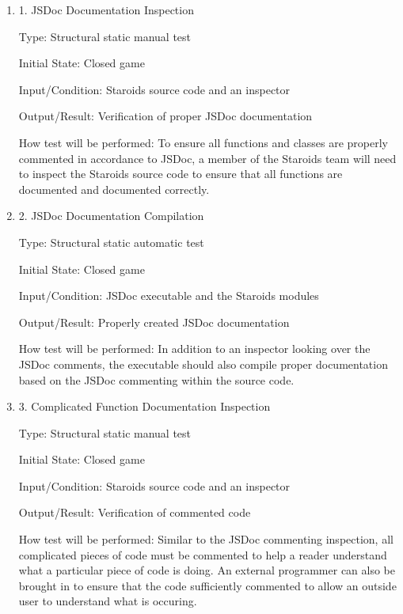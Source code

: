 \documentclass[12pt, titlepage]{article}
\begin{document}
\begin{enumerate}
  
\item{1. JSDoc Documentation Inspection\\}

Type: Structural static manual test

Initial State: Closed game

Input/Condition: Staroids source code and an inspector

Output/Result: Verification of proper JSDoc documentation

How test will be performed: To ensure all functions and classes are properly commented in accordance to JSDoc, a member of the Staroids team will need to inspect the Staroids source code to ensure that all functions are documented and documented correctly.

\item{2. JSDoc Documentation Compilation\\}

Type: Structural static automatic test

Initial State: Closed game

Input/Condition: JSDoc executable and the Staroids modules

Output/Result: Properly created JSDoc documentation

How test will be performed: In addition to an inspector looking over the JSDoc comments, the executable should also compile proper documentation based on the JSDoc commenting within the source code.

\item{3. Complicated Function Documentation Inspection\\}

Type: Structural static manual test

Initial State: Closed game

Input/Condition: Staroids source code and an inspector

Output/Result: Verification of commented code

How test will be performed: Similar to the JSDoc commenting inspection, all complicated pieces of code must be commented to help a reader understand what a particular piece of code is doing. An external programmer can also be brought in to ensure that the code sufficiently commented to allow an outside user to understand what is occuring.

\end{enumerate}
\end{document}
